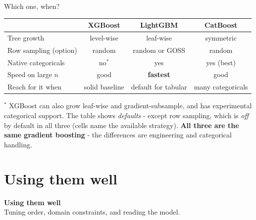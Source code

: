 \documentclass[aspectratio=169]{beamer}
\newcommand{\sectiontransition}[2]{%
  \begin{frame}[plain]
    \vfill
    \begin{center}
      {\Large\color{popblue}\textbf{#1}}\\[10pt]
      {\normalsize #2}
    \end{center}
    \vfill
  \end{frame}}
\begin{document}
\begin{frame}{Which one, when?}
  \begin{center}\small
    \renewcommand{\arraystretch}{1.3}
    \begin{tabular}{l c c c}
      \toprule
                          & \textbf{XGBoost}   & \textbf{LightGBM}    & \textbf{CatBoost} \\
      \midrule
      Tree growth         & level-wise         & leaf-wise            & symmetric \\
      Row sampling (option) & random           & random or GOSS       & random \\
      Native categoricals & no$^{*}$           & yes                  & yes (best) \\
      Speed on large $n$  & good               & \textbf{fastest}     & good \\
      Reach for it when   & solid baseline     & default for tabular  & many categoricals \\
      \bottomrule
    \end{tabular}
  \end{center}
  \vfill
  \footnotesize $^{*}$ XGBoost can also grow leaf-wise and gradient-subsample, and has experimental
  categorical support. The table shows \emph{defaults} - except row sampling, which is \emph{off} by
  default in all three (cells name the available strategy). \textbf{All three are the same gradient
  boosting} - the differences are engineering and categorical handling.
\end{frame}

\section{Using them well}
\sectiontransition{Using them well}{Tuning order, domain constraints, and reading the model.}
\end{document}
